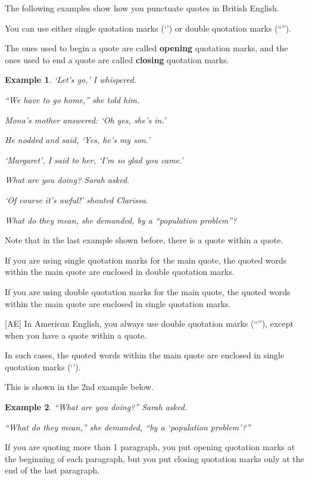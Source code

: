 \documentclass[oneside]{book}
\numberwithin{equation}{section}
\newtheorem{example}{Example}[section]
\begin{document}
%
\noindent{} The following examples show how you punctuate quotes in British English.

You can use either single quotation marks (`') or double quotation marks (``'').

The ones used to begin a quote are called \textbf{opening} quotation marks, and the ones used to end a quote are called \textbf{closing} quotation marks.
\begin{example}
    `Let's go,' I whispered.
    
    ``We have to go home,'' she told him.
    
    Mona's mother answered: `Oh yes, she's in.'
    
    He nodded and said, `Yes, he's my son.'
    
    `Margaret', I said to her, `I'm so glad you came.'
    
    What are you doing? Sarah asked.
    
    `Of course it's awful!' shouted Clarissa.
    
    What do they mean, she demanded, by a ``population problem''?
\end{example}
Note that in the last example shown before, there is a quote within a quote.

If you are using single quotation marks for the main quote, the quoted words within the main quote are enclosed in double quotation marks.

If you are using double quotation marks for the main quote, the quoted words within the main quote are enclosed in single quotation marks.

%
[AE] In American English, you always use double quotation marks (``''), except when you have a quote within a quote.

In such cases, the quoted words within the main quote are enclosed in single quotation marks (`').

This is shown in the 2nd example below.
\begin{example}
    ``What are you doing?'' Sarah asked.
    
    ``What do they mean,'' she demanded, ``by a `population problem'?''
\end{example}
If you are quoting more than 1 paragraph, you put opening quotation marks at the beginning of each paragraph, but you put closing quotation marks only at the end of the last paragraph.
\end{document}
